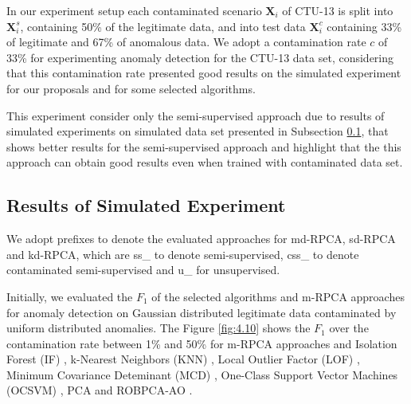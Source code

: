 \documentclass[review]{elsarticle}
\begin{document}
In our experiment setup each contaminated scenario $\pmb{X}_i$ of CTU-13 is split into $\pmb{X}_i^s$, containing 50\% of the legitimate data, and into test data $\pmb{X}_i^c$ containing 33\% of legitimate and 67\% of anomalous data. We adopt a contamination rate $c$ of 33\% for  experimenting anomaly detection for the CTU-13 data set, considering that this contamination rate presented good results on the simulated experiment for our proposals and for some selected algorithms.

This experiment consider only the semi-supervised approach due to results of simulated experiments on simulated data set presented in Subsection \ref{sec:3_simulated_result}, that shows better results for the semi-supervised approach and highlight that the this approach can obtain good results even when trained with contaminated data set.

\subsection{Results of Simulated Experiment}
\label{sec:3_simulated_result}

We adopt prefixes to denote the evaluated approaches for md-RPCA, sd-RPCA and kd-RPCA, which are ss\_ to denote semi-supervised, css\_ to denote contaminated semi-supervised and u\_ for unsupervised.

Initially, we evaluated the $F_1$ of the selected algorithms and m-RPCA approaches for anomaly detection on Gaussian distributed legitimate data contaminated by uniform distributed anomalies. The Figure \ref{fig:4.10} shows the $F_1$ over the contamination rate between 1\% and 50\% for m-RPCA approaches and Isolation Forest (IF) \cite{liu2008isolation}, k-Nearest Neighbors (KNN) \cite{angiulli2002fast}, Local Outlier Factor (LOF) \cite{breunig2000lof}, Minimum Covariance Deteminant (MCD) \cite{rousseeuw1999fastmcd}, One-Class Support Vector Machines (OCSVM) \cite{scholkopf2001estimating}, PCA \cite{shyu2003novel} and ROBPCA-AO \cite{hubert2009robustskewed}.
\end{document}
